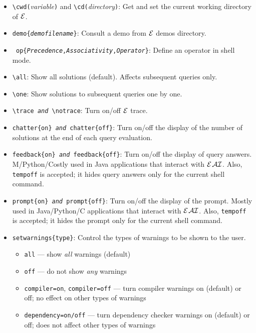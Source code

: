 \documentclass[11pt]{article}
\newcommand{\ERGO}{\mbox{\ensuremath{\cal{E}}\smaller{{\sc{RGO}}}}\xspace}
\newcommand{\ERGOAI}{\mbox{{\ensuremath{\cal{E}}\smaller{{\sc{RGO}}}}\ensuremath{\cal{AI}}}\xspace}
\newcommand{\FLSYSTEM}{\ERGO}
\newcommand{\bs}{\textbackslash}
\begin{document}
\begin{itemize}
\item \texttt{\bs{}cwd(}\emph{variable}\texttt{)} and
  \texttt{\bs{}cd(}\emph{directory}\texttt{)}:
  Get and set the current working directory of \FLSYSTEM.
\item {\tt demo\{\textnormal{\emph{demofilename}}\}}:
    Consult a demo from \FLSYSTEM demos directory.
\item {\tt
    op\{\textnormal{\emph{Precedence}},\textnormal{\emph{Associativity}},\textnormal{\emph{Operator}}\}}:
    Define an operator in shell mode.
\item {\tt \bs{}all}:
    Show all solutions (default). Affects subsequent queries only.
\item {\tt \bs{}one}:
    Show solutions to subsequent queries one by one.
    \index{\bs{}trace}
    \index{\bs{}notrace}
\item {\tt \bs{}trace \textnormal{\emph{and}} \bs{}notrace}:
    Turn on/off \FLSYSTEM trace.
\item {\tt chatter\{on\} \textnormal{\emph{and}} chatter\{off\}}:
  Turn on/off the display of the number of solutions at the end of each query
  evaluation.
\item {\tt feedback\{on\} \textnormal{\emph{and}} feedback\{off\}}:
  Turn on/off the display of query answers. M/Python/Costly used in Java
  applications that interact with \ERGOAI.
  Also, \texttt{tempoff} is accepted; it hides query answers only for the
  current shell command. 
\item {\tt prompt\{on\} \textnormal{\emph{and}} prompt\{off\}}:
  Turn on/off the display of the prompt. Mostly used in Java/Python/C applications that interact with \ERGOAI.
  Also, \texttt{tempoff} is accepted; it hides the prompt only for the
  current shell command. 
\item {\tt setwarnings\{type\}}:
  Control the types of warnings to be shown to the user.
  \begin{itemize}
  \item {\tt all} --- show \emph{all} warnings (default)
  \item {\tt off} --- do not show \emph{any}  warnings
  \item {\tt compiler=on}, \texttt{compiler=off}  --- turn compiler warnings on
    (default) or off; no effect on other types of warnings 
  \item  {\tt dependency=on/off} --- turn dependency
    checker warnings on (default) or off; does not affect other types of warnings

\end{itemize}
\end{itemize}
\end{document}
